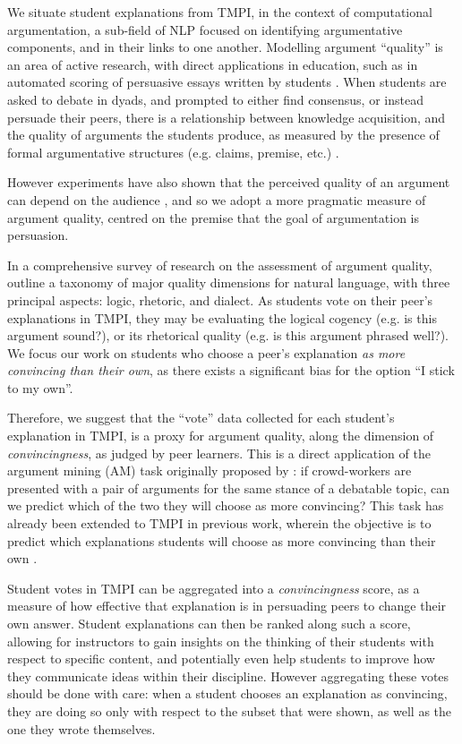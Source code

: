 \documentclass[notitlepage,12pt]{jedm}
\begin{document}
We situate student explanations from TMPI, in the context of computational 
argumentation, a sub-field of NLP focused on identifying argumentative 
components, and in their links to one another.
Modelling argument ``quality'' is an area of active research, with direct 
applications in education, such as in automated scoring of 
persuasive essays written by students \cite{persing_modeling_2015} 
\cite{nguyen_argument_2018}.
When students are asked to debate in dyads, and prompted to either find 
consensus, or instead persuade their peers, there is a relationship between  
knowledge acquisition, and the quality of arguments the students produce, as 
measured by the presence of formal argumentative structures (e.g. claims, 
premise, etc.) \cite{garcia-mila_effect_2013}.

However experiments have also shown that the perceived quality of an argument 
can depend on the audience \cite{mercier_why_2011}, and so we adopt a more 
pragmatic measure of argument quality, centred on the premise that the goal of 
argumentation is persuasion.

In a comprehensive survey of research on the assessment of argument quality, 
\cite{wachsmuth_computational_2017} outline a taxonomy of major quality 
dimensions for natural language, with three principal aspects: logic, rhetoric, 
and dialect. 
As students vote on their peer's explanations in TMPI, they may be evaluating 
the logical cogency (e.g. is this argument sound?), or its rhetorical quality 
(e.g. is this argument phrased well?). 
We focus our work on students who choose a peer's explanation \textit{as more 
convincing than their own}, as there exists a significant bias for the option 
``I stick to my own''.

Therefore, we suggest that the ``vote'' data collected for each student's 
explanation in TMPI, is a proxy for argument quality, along the dimension of 
\textit{convincingness}, as judged by peer learners. 
This is a direct application of the argument mining (AM) task originally 
proposed by \cite{habernal_which_2016}: if crowd-workers are presented with a 
pair of arguments for the same stance of a debatable topic, can we predict 
which of the two they will choose as more convincing?
This task has already been extended to TMPI in previous work, wherein the 
objective is to predict which explanations students will choose as more 
convincing than their own \cite{bhatnagar_learnersourcing_2020}.

Student votes in TMPI can be aggregated into a \textit{convincingness} score, 
as a measure of how effective that explanation is in persuading peers to change 
their own answer.
Student explanations can then be ranked along such a score, allowing for 
instructors to gain insights on the thinking of their students with respect to 
specific content, and potentially even help students to improve how they 
communicate ideas within their discipline.
However aggregating these votes should be done with care: when a student 
chooses an explanation as convincing, they are doing so only with respect to 
the subset that were shown, as well as the one they wrote themselves.
\end{document}
